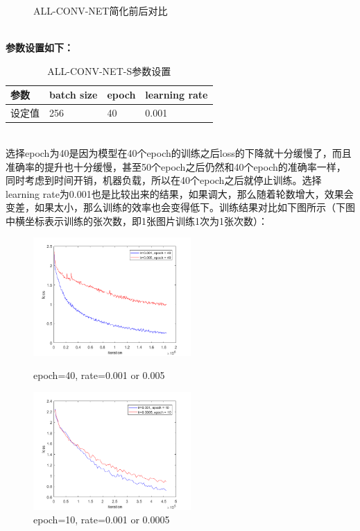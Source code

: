 \documentclass[a4paper,UTF8]{article}
\numberwithin{equation}{section}
\begin{document}
\begin{enumerate}
\begin{figure}[!h]
	\caption{ALL-CONV-NET简化前后对比} 
	\label{acn0}
\end{figure}\\
\textbf{参数设置如下：}
\begin{table}[h]
	\centering
	\caption{ALL-CONV-NET-S参数设置}
	\label{acn1}
	\begin{tabular}{|l|l|l|l|}
		\hline
	参数	& batch size & epoch & learning rate \\ \hline
	设定值	& 256 & 40 & 0.001 \\ \hline
	\end{tabular}
\end{table}\\
选择epoch为40是因为模型在40个epoch的训练之后loss的下降就十分缓慢了，而且准确率的提升也十分缓慢，甚至50个epoch之后仍然和40个epoch的准确率一样，同时考虑到时间开销，机器负载，所以在40个epoch之后就停止训练。选择learning rate为0.001也是比较出来的结果，如果调大，那么随着轮数增大，效果会变差，如果太小，那么训练的效率也会变得低下。训练结果对比如下图所示（下图中横坐标表示训练的张次数，即1张图片训练1次为1张次数）：
\begin{figure}[htbp]
	\centering
	\begin{minipage}[t]{0.48\textwidth}
		\centering
		\includegraphics[width=6cm]{acns-001-005-40.png}
		\caption{epoch=40, rate=0.001 or 0.005}
	\end{minipage}
	\begin{minipage}[t]{0.48\textwidth}
		\centering
		\includegraphics[width=6cm]{acns-001-0005-10.png}
		\caption{epoch=10, rate=0.001 or 0.0005}
	\end{minipage}
\end{figure}\\

\end{enumerate}
\end{document}
